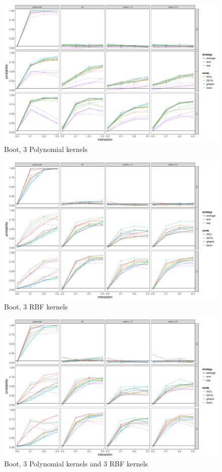 \documentclass[11pt]{article}
\begin{document}
\begin{figure}
\begin{center}
\includegraphics[width=0.9\columnwidth]{B2} 
\caption{Boot, 3 Polynomial kernels}
\label{fig:res}
\end{center}
\end{figure}

\begin{figure}
\begin{center}
\includegraphics[width=0.9\columnwidth]{B3} 
\caption{Boot, 3 RBF kernels}
\label{fig:res}
\end{center}
\end{figure}

\begin{figure}
\begin{center}
\includegraphics[width=0.9\columnwidth]{B4} 
\caption{Boot, 3 Polynomial kernels and 3 RBF kernels}
\label{fig:res}
\end{center}
\end{figure}
\end{document}
